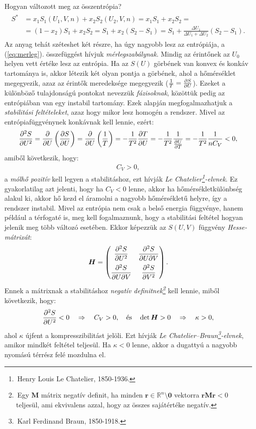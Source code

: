 Hogyan változott meg az összentrópia?
\begin{align}\label{eq:merleg}
\begin{split}
	S^* &= x_1S_1(U_1,V,n)+x_2S_2(U_2,V,n) = x_1S_1+x_2S_2=\\
	&=(1-x_2)S_1+x_2S_2 = S_1+x_2(S_2-S_1) = S_1 + \frac{\Delta U_1}{\Delta U_1{+}\Delta U_2}(S_2-S_1).
\end{split}
\end{align}
Az anyag tehát széteshet két részre, ha úgy nagyobb lesz az entrópiája, a (\ref{eq:merleg}). összefüggést hívjuk \emph{mérlegszabálynak}. Mindig az érintőnek az $U_0$ helyen vett értéke lesz az entrópia. Ha az $S(U)$ görbének van konvex és konkáv tartománya is, akkor létezik két olyan pontja a görbének, ahol a hőmérséklet megegyezik, azaz az érintők meredeksége megegyezik ($\frac{1}{T} = \frac{\partial{S}}{\partial{U}}$). Ezeket a különböző tulajdonságú pontokat nevezzük \emph{fázisoknak}, közöttük pedig az entrópiában van egy instabil tartomány. Ezek alapján megfogalmazhatjuk a \emph{stabilitási feltételeket}, azaz hogy mikor lesz homogén a rendszer. Mivel az entrópiafüggvénynek konkávnak kell lennie, ezért:
\begin{align}
	\frac{\partial^2 S}{\partial U^2} = \frac{\partial{}}{\partial{U}}\left({\frac{\partial{S}}{\partial{U}}}\right)=\frac{\partial{}}{\partial{U}}\left({\frac{1}{T}}\right) = -\frac{1}{T^2}\frac{\partial{T}}{\partial{U}} = -\frac{1}{T^2}\frac{1}{\frac{\partial{U}}{\partial{T}}}=-\frac{1}{T^2}\frac{1}{nC_V}<0,
\end{align}
amiből következik, hogy:
\begin{align}
	C_V>0,
\end{align}
a \emph{mólhő pozitív} kell legyen a stabilitáshoz, ezt hívják \emph{Le Chatelier\footnote{\,Henry Louis Le Chatelier, 1850-1936.}-elvnek}. Ez gyakorlatilag azt jelenti, hogy ha $C_V<0$ lenne, akkor ha hőmérsékletkülönbség alakul ki, akkor hő kezd el áramolni a nagyobb hőmérsékletű helyre, így a rendszer instabil. Mivel az entrópia nem csak a belső energia függvénye, hanem például a térfogaté is, meg kell fogalmaznunk, hogy a stabilitási feltétel hogyan jelenik meg több változó esetében. Ekkor képezzük az $S(U,V)$ függvény \emph{Hesse-mátrixát}:
\begin{align}
	\bm H =
	\begin{pmatrix}
	\dfrac{\partial^2 S}{\partial U^2} & \dfrac{\partial ^2 S}{\partial U\partial V}\vspace{2mm}\\
	\dfrac{\partial ^2 S}{\partial U\partial V} & \dfrac{\partial^2 S}{\partial V^2}
	\end{pmatrix}.
\end{align}
Ennek a mátrixnak a stabilitáshoz \emph{negatív definitnek\footnote{\,Egy $\bm M$ mátrix negatív definit, ha minden $\bm r\in\mathbb R^n{\setminus} \bm 0 $ vektorra $\bm r\bm M \bm r<0$ teljesül, ami ekvivalens azzal, hogy az összes sajátértéke negatív.}} kell lennie, miből következik, hogy:
\begin{align}
	\frac{\partial^2 S}{\partial U^2}<0\quad\Rightarrow\quad C_V>0,\quad \textnormal{és}\quad \det \bm H>0\quad\Rightarrow\quad \kappa>0,
\end{align}
ahol $\kappa$ újfent a kompresszibilitást jelöli. Ezt hívják \emph{Le Chatelier--Braun\footnote{\,Karl Ferdinand Braun, 1850-1918.}-elvnek}, amikor mindkét feltétel teljesül. Ha $\kappa<0$ lenne, akkor a dugattyú a nagyobb nyomású térrész felé mozdulna el.
